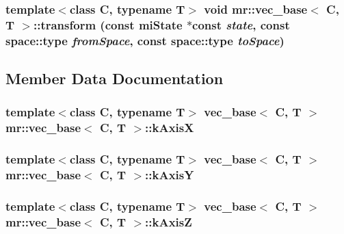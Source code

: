\subsubsection{\setlength{\rightskip}{0pt plus 5cm}template$<$class C, typename T$>$ void {\bf mr::vec\_\-base}$<$ C, T $>$::transform (const mi\-State $\ast$const {\em state}, const {\bf space::type} {\em from\-Space}, const {\bf space::type} {\em to\-Space})\hspace{0.3cm}{\tt  [inline]}}\label{structmr_1_1vec__base_a15}




\subsection{Member Data Documentation}
\subsubsection{\setlength{\rightskip}{0pt plus 5cm}template$<$class C, typename T$>$ {\bf vec\_\-base}$<$ C, T $>$ {\bf mr::vec\_\-base}$<$ C, T $>$::{\bf k\-Axis\-X}\hspace{0.3cm}{\tt  [static]}}\label{structmr_1_1vec__base_s1}


\subsubsection{\setlength{\rightskip}{0pt plus 5cm}template$<$class C, typename T$>$ {\bf vec\_\-base}$<$ C, T $>$ {\bf mr::vec\_\-base}$<$ C, T $>$::{\bf k\-Axis\-Y}\hspace{0.3cm}{\tt  [static]}}\label{structmr_1_1vec__base_s2}


\subsubsection{\setlength{\rightskip}{0pt plus 5cm}template$<$class C, typename T$>$ {\bf vec\_\-base}$<$ C, T $>$ {\bf mr::vec\_\-base}$<$ C, T $>$::{\bf k\-Axis\-Z}\hspace{0.3cm}{\tt  [static]}}\label{structmr_1_1vec__base_s3}


